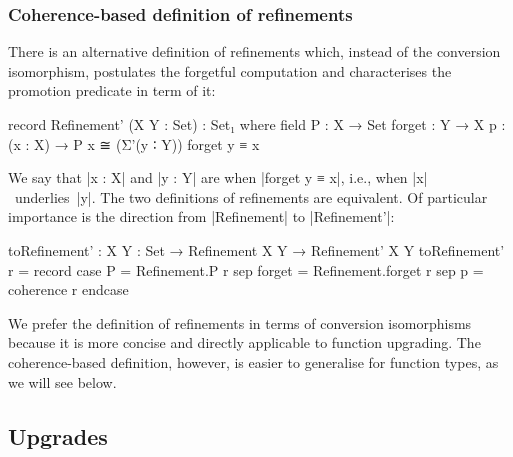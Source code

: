 
\subsubsection{Coherence-based definition of refinements}

There is an alternative definition of refinements which, instead of the conversion isomorphism, postulates the forgetful computation and characterises the promotion predicate in term of it:
\begin{code}
record Refinement' (X Y : Set) : Set₁ where
  field
    P       :  X → Set
    forget  :  Y → X
    p       :  (x : X) → P x ≅ (Σ'(y ∶ Y)) forget y ≡ x
\end{code}
We say that |x : X| and |y : Y| are  when |forget y ≡ x|, i.e., when |x|~underlies~|y|.
The two definitions of refinements are equivalent.
Of particular importance is the direction from |Refinement| to |Refinement'|:
\begin{code}
toRefinement' : {X Y : Set} → Refinement X Y → Refinement' X Y
toRefinement' r = record  case  P       =  Refinement.P r
                          sep   forget  =  Refinement.forget r
                          sep   p       =  coherence r endcase
\end{code}
We prefer the definition of refinements in terms of conversion isomorphisms because it is more concise and directly applicable to function upgrading.
The coherence-based definition, however, is easier to generalise for function types, as we will see below.

\subsection{Upgrades}
\label{sec:upgrades}

